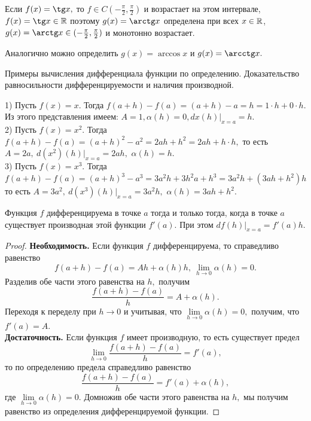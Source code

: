 Если $f(x)=\tg x,$ то $f \in C(-\frac{\pi}{2},
    \frac{\pi}{2})$ и возрастает на этом интервале,
$f(x)=\tg x \in \R$ поэтому $g(x)=\arctg x$ определена
при всех $x \in \mathbb{R}$, $g(x)=\arctg x \in (-\frac{\pi}{2},
    \frac{\pi}{2})$ и монотонно возрастает.

Аналогично можно определить $g(x)=\arccos x$ и
$g(x)=\arcctg x.$

\newpage

\begin{problem}
Примеры вычисления дифференциала функции по определению. Доказательство равносильности дифференцируемости и наличия производной.
\end{problem}

\begin{example}
    1) Пусть $f(x)=x.$
    Тогда $f(a+h)-f(a)=(a+h)-a=h=1\cdot h+0\cdot h.$
    Из этого представления имеем: $A=1,
        \alpha(h)=0, dx(h)|_{x=a}=h.$\\
    2) Пусть $f(x)=x^2.$ Тогда
    $f(a+h)-f(a)=(a+h)^2-a^2=2ah+h^2=
        2ah+h\cdot h,$ то есть $A=2a, \ d(x^2)(h)|_{x=a}=
        2ah,$ $\alpha(h)=h.$\\
    3) Пусть $f(x)=x^3.$ Тогда
    $f(a+h)-f(a)=(a+h)^3-a^3=3a^2h+3h^2a+h^3=
        3a^2h+(3ah+h^2)h$ то есть $A=3a^2, \ d(x^3)(h)|_{x=a}=
        3a^2h,$ $\alpha(h)=3ah+h^2.$
\end{example}

\begin{proposition}
    Функция $f$ дифференцируема в точке $a$
    тогда и только тогда, когда в точке
    $a$ существует производная этой функции $f'(a).$
    При этом $df(h)|_{x=a}=f'(a)h.$
\end{proposition}
\begin{proof}
    \textbf{Необходимость.} Если функция $f$
    дифференцируема,
    то справедливо равенство
    $$
        f(a+h)-f(a)=Ah+
        \alpha(h)h, \
        \lim\limits_{h\rightarrow0}\alpha(h)=0.
    $$
    Разделив обе части этого
    равенства на $h,$ получим
    $$
        \frac{f(a+h)-f(a)}{h}=A+\alpha(h).
    $$
    Переходя к переделу при $h\rightarrow0$
    и учитывая, что $\lim\limits_{h\rightarrow0}
        \alpha(h)=0,$ получим, что $f'(a)=A.$\\
    \textbf{Достаточность.} Если функция $f$
    имеет производную, то есть существует
    предел
    $$
        \lim\limits_{h\rightarrow0}
        \frac{f(a+h)-f(a)}{h}=f'(a),
    $$
    то по определению
    предела справедливо равенство
    $$
        \frac{f(a+h)-f(a)}{h}=f'(a)+\alpha(h),
    $$
    где $\lim\limits_{h\rightarrow0}
        \alpha(h)=0.$
    Домножив обе части этого равенства
    на $h,$ мы получим равенство из
    определения дифференцируемой функции.
\end{proof}

